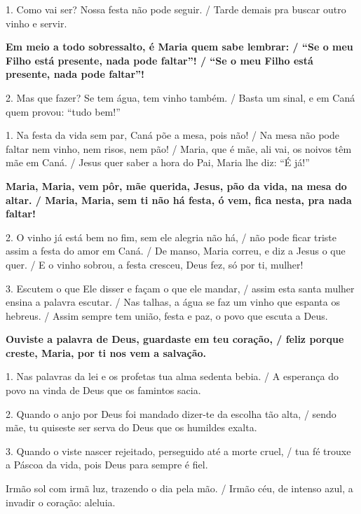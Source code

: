 \documentclass[a5paper,9pt]{extarticle}
\begin{document}
\begin{cantos}
\begin{canto}
1. Como vai ser? Nossa festa não pode seguir. / Tarde demais pra buscar outro vinho e servir.

\textbf{Em meio a todo sobressalto, é Maria quem sabe lembrar: / ``Se o meu Filho está presente, nada pode faltar''! / ``Se o meu Filho está presente, nada pode faltar''!}

2. Mas que fazer? Se tem água, tem vinho também. / Basta um sinal, e em Caná quem provou: ``tudo bem!''
\end{canto}

\begin{canto}
1. Na festa da vida sem par, Caná põe a mesa, pois não! / Na mesa não pode faltar nem vinho, nem risos, nem pão! / Maria, que é mãe, ali vai, os noivos têm mãe em Caná. / Jesus quer saber a hora do Pai, Maria lhe diz: ``É já!''

\textbf{Maria, Maria, vem pôr, mãe querida, Jesus, pão da vida, na mesa do altar. / Maria, Maria, sem ti não há festa, ó vem, fica nesta, pra nada faltar!}

2. O vinho já está bem no fim, sem ele alegria não há, / não pode ficar triste assim a festa do amor em Caná. / De manso, Maria correu, e diz a Jesus o que quer. / E o vinho sobrou, a festa cresceu, Deus fez, só por ti, mulher!

3. Escutem o que Ele disser e façam o que ele mandar, / assim esta santa mulher ensina a palavra escutar. / Nas talhas, a água se faz um vinho que espanta os hebreus. / Assim sempre tem união, festa e paz, o povo que escuta a Deus.
\end{canto}

\begin{canto}
\textbf{Ouviste a palavra de Deus, guardaste em teu coração, / feliz porque creste, Maria, por ti nos vem a salvação. }

1. Nas palavras da lei e os profetas tua alma sedenta bebia. / A esperança do povo na vinda de Deus que os famintos sacia.

2. Quando o anjo por Deus foi mandado dizer-te da escolha tão alta, / sendo mãe, tu quiseste ser serva do Deus que os humildes exalta.

3. Quando o viste nascer rejeitado, perseguido até a morte cruel, / tua fé trouxe a Páscoa da vida, pois Deus para sempre é fiel.
\end{canto}

\begin{canto}
Irmão sol com irmã luz, trazendo o dia pela mão. / Irmão céu, de intenso azul, a invadir o coração: aleluia.


\end{canto}
\end{cantos}
\end{document}
